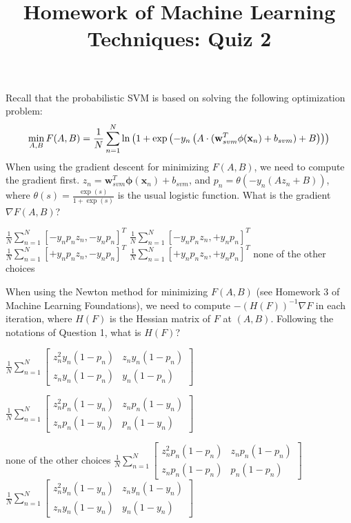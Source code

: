 \documentclass[a4paper,10pt]{exam}
\title{Homework of Machine Learning Techniques: Quiz 2}
\date{}
\author{}
\begin{document}
\maketitle
\begin{questions}
	\question Recall that the probabilistic SVM is based on solving the following optimization problem:
	\[\mathop {\min }\limits_{A,B} F(A,B) = \frac{1}{N}\sum\limits_{n = 1}^N {\ln } \left( {1 + \exp \left( { - {y_n}\left( {A \cdot ({\bf{w}}_{svm}^T\phi ({{\bf{x}}_n}) + {b_{svm}}) + B} \right)} \right)} \right)\]
	When using the gradient descent for minimizing $F(A,B)$, we need to compute the gradient first. $z_n = \mathbf{w}_{svm}^T   \mathbf{\phi}(\mathbf{x}_n)+b_{svm}$, and $p_n = \theta(-y_n( A z_n + B))$, where $\theta(s) = \frac{\exp(s)}{1+\exp(s)}$ is the usual logistic function. What is the gradient $\nabla F(A,B)$?
	\begin{checkboxes}
		\CorrectChoice $\frac{1}{N}\sum_{n=1}^N [-y_np_nz_n, -y_np_n ]^T$
		\choice $\frac{1}{N}\sum_{n=1}^N [ -y_np_nz_n, +y_np_n ]^T$
		\choice $\frac{1}{N}\sum_{n=1}^N [ +y_np_nz_n, -y_np_n ]^T$
		\choice $\frac{1}{N}\sum_{n=1}^N [ +y_np_nz_n, +y_np_n ]^T$
		\choice none of the other choices\\
	\end{checkboxes}

	\question When using the Newton method for minimizing $F(A,B)$ (see Homework 3 of Machine Learning Foundations), we need to compute $-(H(F))^{-1}\nabla F $ in each iteration, where $H(F)$ is the Hessian matrix of $F$ at $(A,B)$. Following the notations of Question 1, what is $H(F)$?
	\begin{checkboxes}
		\choice 	$\frac{1}{N}\sum\limits_{n = 1}^N {\left[ {\begin{array}{*{20}{c}}
							{z_n^2{y_n}(1 - {p_n})} & {{z_n}{y_n}(1 - {p_n})} \\
							{{z_n}{y_n}(1 - {p_n})} & {{y_n}(1 - {p_n})}
						\end{array}} \right]} $

		\choice  $\frac{1}{N}\sum\limits_{n = 1}^N {\left[ {\begin{array}{*{20}{c}}
							{z_n^2{p_n}(1 - {y_n})} & {{z_n}{p_n}(1 - {y_n})} \\
							{{z_n}{p_n}(1 - {y_n})} & {{p_n}(1 - {y_n})}
						\end{array}} \right]} $

		\choice none of the other choices
		\CorrectChoice $\frac{1}{N}\sum\limits_{n = 1}^N {\left[ {\begin{array}{*{20}{c}}
							{z_n^2{p_n}(1 - {p_n})} & {{z_n}{p_n}(1 - {p_n})} \\
							{{z_n}{p_n}(1 - {p_n})} & {{p_n}(1 - {p_n})}
						\end{array}} \right]} $
		\choice $\frac{1}{N}\sum\limits_{n = 1}^N {\left[ {\begin{array}{*{20}{c}}
							{z_n^2{y_n}(1 - {y_n})} & {{z_n}{y_n}(1 - {y_n})} \\
							{{z_n}{y_n}(1 - {y_n})} & {{y_n}(1 - {y_n})}
						\end{array}} \right]} $\\
	\end{checkboxes}


\end{questions}
\end{document}
